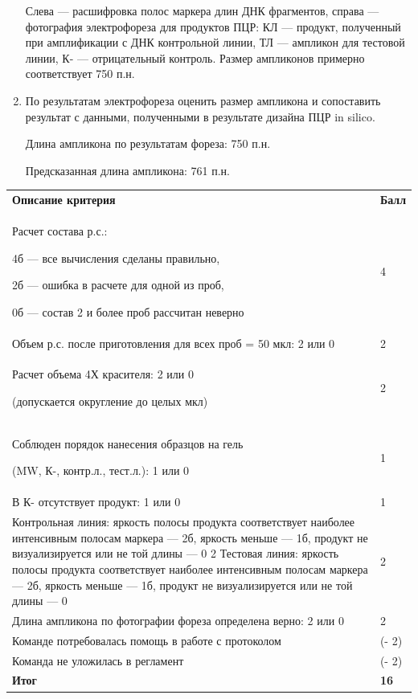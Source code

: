 \begin{enumerate}
    Слева — расшифровка полос маркера длин ДНК фрагментов, справа — фотография электрофореза для продуктов ПЦР: КЛ — продукт, полученный при амплификации с ДНК контрольной линии, ТЛ — ампликон для тестовой линии, К- — отрицательный контроль. Размер ампликонов примерно соответствует 750 п.н.

    \item По результатам электрофореза оценить размер ампликона и сопоставить результат с данными, полученными в результате дизайна ПЦР in silico.

    Длина ампликона по результатам фореза: 750 п.н.

    Предсказанная длина ампликона: 761 п.н.

\end{enumerate}

\markSection

\begin{tabular}{|p{11cm}|p{3cm}|}
    \hline
    \textbf{Описание критерия} & \textbf{Балл} \\
    Расчет состава р.с.: 

    4б — все вычисления сделаны правильно, 

    2б — ошибка в расчете для одной из проб, 

    0б — состав 2 и более проб рассчитан неверно & 4 \\
    \hline
    Объем р.с. после приготовления для всех проб = 50 мкл: 2 или 0 & 2 \\
    \hline
    Расчет объема 4Х красителя: 2 или 0

    (допускается округление до целых мкл) & 2 \\
    \hline
    Соблюден порядок нанесения образцов на гель 

    (MW, К-, контр.л., тест.л.): 1 или 0 & 1 \\
    \hline
    В К- отсутствует продукт: 1 или 0 & 1 \\
    Контрольная линия: 
    яркость полосы продукта соответствует наиболее интенсивным полосам маркера — 2б, 
    яркость меньше — 1б, 
    продукт не визуализируется или не той длины — 0	2
    Тестовая линия: яркость полосы продукта соответствует наиболее интенсивным полосам маркера — 2б, 
    яркость меньше — 1б, 
    продукт не визуализируется или не той длины — 0 & 2 \\
    \hline
    Длина ампликона по фотографии фореза определена верно: 2 или 0 & 2 \\
    \hline
    Команде потребовалась помощь в работе с протоколом & (- 2) \\
    \hline
    Команда не уложилась в регламент & (- 2) \\
    \hline
    \hline
    \textbf{Итог} & \textbf{16} \\
    \hline 
\end{tabular}